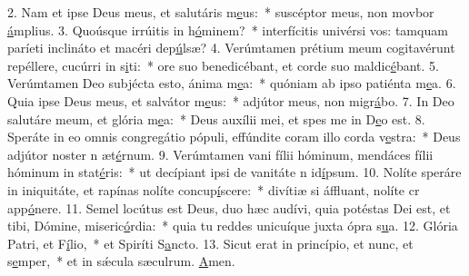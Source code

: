 2. Nam et ipse Deus meus, et salutáris m\uline{e}us:~* suscéptor meus, non movbor \uline{á}mplius.
3. Quoúsque irrúitis in h\uline{ó}minem?~* interfícitis univérsi vos: tamquam paríeti inclináto et macéri dep\uline{ú}lsæ?
4. Verúmtamen prétium meum cogitavérunt repéllere, cucúrri in s\uline{i}ti:~* ore suo benedicébant, et corde suo maldic\uline{é}bant.
5. Verúmtamen Deo subjécta esto, ánima m\uline{e}a:~* quóniam ab ipso patiénta m\uline{e}a.
6. Quia ipse Deus meus, et salvátor m\uline{e}us:~* adjútor meus, non migr\uline{á}bo.
7. In Deo salutáre meum, et glória m\uline{e}a:~* Deus auxílii mei, et spes me in D\uline{e}o est.
8. Speráte in eo omnis congregátio pópuli, effúndite coram illo corda v\uline{e}stra:~* Deus adjútor noster n æt\uline{é}rnum.
9. Verúmtamen vani fílii hóminum, mendáces fílii hóminum in stat\uline{é}ris:~* ut decípiant ipsi de vanitáte n id\uline{í}psum.
10. Nolíte speráre in iniquitáte, et rapínas nolíte concup\uline{í}scere:~* divítiæ si áffluant, nolíte cr app\uline{ó}nere.
11. Semel locútus est Deus, duo hæc audívi, quia potéstas Dei est, et tibi, Dómine, miseric\uline{ó}rdia:~* quia tu reddes unicuíque juxta ópra s\uline{u}a.
12. Glória Patri, et F\uline{í}lio,~* et Spiríti S\uline{a}ncto.
13. Sicut erat in princípio, et nunc, et s\uline{e}mper,~* et in sǽcula sæculrum. \uline{A}men.

